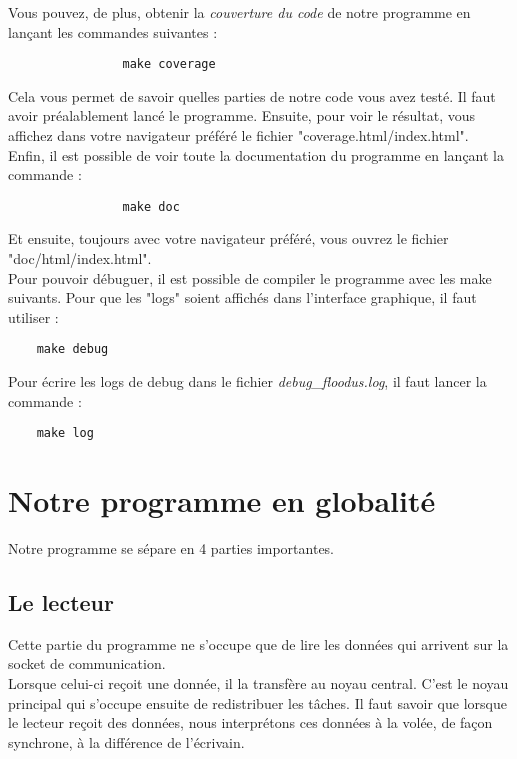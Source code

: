 \documentclass{FR16}
\begin{document}
Vous pouvez, de plus, obtenir la \textit{couverture du code} de notre programme en lançant les commandes suivantes :
\begin{verbatim}
                make coverage
\end{verbatim}
Cela vous permet de savoir quelles parties de notre code vous avez testé. Il faut avoir préalablement lancé le programme. Ensuite, pour voir le résultat, vous affichez dans votre navigateur préféré le fichier "coverage.html/index.html".\\

Enfin, il est possible de voir toute la documentation du programme en lançant la commande :
\begin{verbatim}
                make doc
\end{verbatim}
Et ensuite, toujours avec votre navigateur préféré, vous ouvrez le fichier "doc/html/index.html". \\

Pour pouvoir débuguer, il est possible de compiler le programme avec les make suivants. Pour que les "logs" soient affichés dans l'interface graphique, il faut utiliser : 
\begin{verbatim}
    make debug
\end{verbatim}
Pour écrire les logs de debug dans le fichier \textit{debug\_floodus.log}, il faut lancer la commande :  
\begin{verbatim}
    make log
\end{verbatim}



\newpage



\section{Notre programme en globalité}
Notre programme se sépare en 4 parties importantes.

\subsection{Le lecteur}
Cette partie du programme ne s'occupe que de lire les données qui arrivent sur la socket de communication.\\
Lorsque celui-ci reçoit une donnée, il la transfère au noyau central. C'est le noyau principal qui s'occupe ensuite de redistribuer les tâches. Il faut savoir que lorsque le lecteur reçoit des données, nous interprétons ces données à la volée, de façon synchrone, à la différence de l'écrivain.
 
\end{document}

